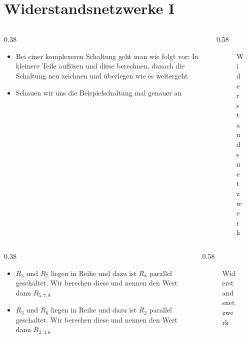 
\section{Widerstandsnetzwerke I}
\label{section:reihe_parallel_widerstandsnetz_1}
\begin{frame}%

\begin{columns}
    \begin{column}{0.38\textwidth}
    \begin{itemize}
  \item Bei einer komplexeren Schaltung geht man wie folgt vor: In kleinere Teile auflösen und diese berechnen, danach die Schaltung neu zeichnen und überlegen wie es weitergeht
  \item Schauen wir uns die Beispielschaltung mal genauer an
  \end{itemize}

    \end{column}
   \begin{column}{0.58\textwidth}
       
\begin{figure}
    \caption{\scriptsize Widerstandsnetzwerk}
    \label{e_widerstandsnetzwerk_1}
\end{figure}


   \end{column}
\end{columns}

\end{frame}

\begin{frame}
\begin{columns}
    \begin{column}{0.38\textwidth}
    \begin{itemize}
  \item $R_5$ und $R_7$ liegen in Reihe und dazu ist $R_8$ parallel geschaltet. Wir berechen diese und nennen den Wert dann $R_{ 5,7,8 }$
  \item $R_3$ und $R_6$ liegen in Reihe und dazu ist $R_2$ parallel geschaltet. Wir berechen diese und nennen den Wert dann $R_{ 2,3,6 }$
  \end{itemize}

    \end{column}
   \begin{column}{0.58\textwidth}
       
\begin{figure}
    \caption{\scriptsize Widerstandsnetzwerk}
    \label{e_widerstandsnetzwerk_1}
\end{figure}


   \end{column}
\end{columns}

\end{frame}

